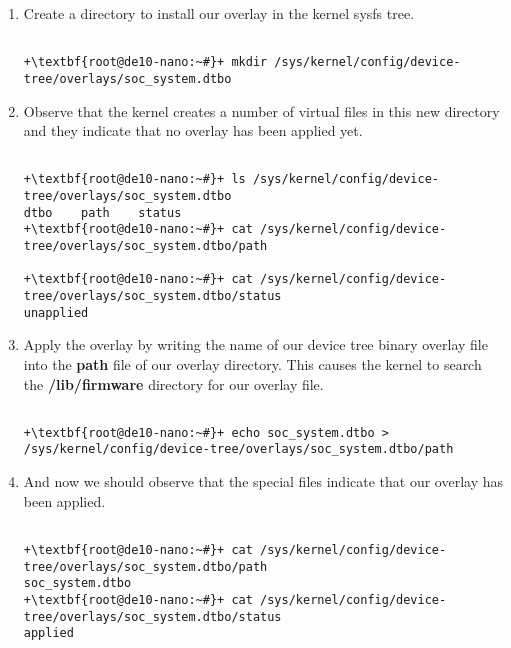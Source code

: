 \begin{flushleft}
\begin{enumerate}[
	label=\textbf{Step \arabic*.},
	leftmargin=*,
	widest={00},
	align=left]
\begin{enumerate}[
	label=\textbf{Step \arabic{enumi}\alph*.},
	leftmargin=*,
	align=left]
\item Create a directory to install our overlay in the kernel sysfs tree.

\begin{verbatim}

+\textbf{root@de10-nano:~#}+ mkdir /sys/kernel/config/device-tree/overlays/soc_system.dtbo

\end{verbatim}

\item Observe that the kernel creates a number of virtual files in this new directory and they indicate that no overlay has been applied yet.

\begin{verbatim}

+\textbf{root@de10-nano:~#}+ ls /sys/kernel/config/device-tree/overlays/soc_system.dtbo
dtbo    path    status
+\textbf{root@de10-nano:~#}+ cat /sys/kernel/config/device-tree/overlays/soc_system.dtbo/path

+\textbf{root@de10-nano:~#}+ cat /sys/kernel/config/device-tree/overlays/soc_system.dtbo/status
unapplied

\end{verbatim}

\item Apply the overlay by writing the name of our device tree binary overlay file into the \textbf{path} file of our overlay directory.  This causes the kernel to search the \textbf{/lib/firmware} directory for our overlay file.

\begin{verbatim}

+\textbf{root@de10-nano:~#}+ echo soc_system.dtbo > /sys/kernel/config/device-tree/overlays/soc_system.dtbo/path

\end{verbatim}

\item And now we should observe that the special files indicate that our overlay has been applied.

\begin{verbatim}

+\textbf{root@de10-nano:~#}+ cat /sys/kernel/config/device-tree/overlays/soc_system.dtbo/path
soc_system.dtbo
+\textbf{root@de10-nano:~#}+ cat /sys/kernel/config/device-tree/overlays/soc_system.dtbo/status
applied


\end{verbatim}
\end{enumerate}
\end{enumerate}
\end{flushleft}
